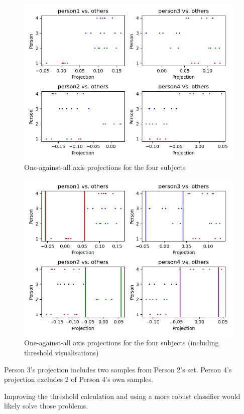 \documentclass{bmvc2k}
\begin{document}
\begin{figure}[H]
   \begin{center}
      \includegraphics[width=11cm]{figures/ProjectionsNoT.png}
   \end{center}
   \caption{One-against-all axis projections for the four subjects}
\end{figure}
\begin{figure}[H]
   \begin{center}
      \includegraphics[width=11cm]{figures/ProjectionsT.png}
   \end{center}
   \caption{One-against-all axis projections for the four subjects (including threshold visualisations)}
\end{figure}

Person 3's projection includes two samples from Person 2's set. Person 4's projection excludes 2 of Person 4's own samples.

Improving the threshold calculation and using a more robust classifier would likely solve those problems.
\end{document}
